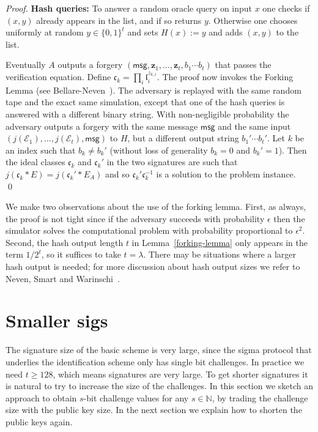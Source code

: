 \documentclass{llncs}
\newcommand{\E}{\mathcal{E}}
\newcommand{\N}{\mathbb{N}}
\newcommand{\msg}{\mathsf{msg}}
\renewcommand{\c}{\mathfrak{c}}
\renewcommand{\l}{\mathfrak{l}}
\newcommand{\z}{\mathbf{z}}
\begin{document}
\begin{proof}
\vskip 0.1cm

\noindent \textbf{Hash queries:}
To answer a random oracle query on input $x$ one checks if $(x,y)$ already appears in the list, and if so returns $y$. Otherwise one chooses uniformly at random $y \in \{0,1\}^t$ and sets $H(x) := y$ and adds $(x,y)$ to the list.

\vskip 0.1cm

Eventually $A$ outputs a forgery $(\msg, \z_1, \dots, \z_t, b_1\cdots b_t)$ that passes the verification equation.
Define $\c_k = \prod_i \l_i^{z_{k,i}}$.
The proof now invokes the Forking Lemma (see Bellare-Neven~\cite{BN06}). The adversary is replayed with the same random tape and the exact same simulation, except that one of the hash queries is answered with a different binary string.
With non-negligible probability the adversary outputs a forgery with the same message $\msg$ and the same input $(j(\E_1), \dots, j(\E_t), \msg)$ to $H$, but a different output string $b_1'\cdots b_t'$. Let $k$ be an index such that $b_k \ne b_k'$ (without loss of generality $b_k = 0$ and $b_k' = 1$). Then the ideal classes $\c_k$ and $\c_k'$ in the two signatures are such that $j( \c_k * E ) = j( \c_k' * E_A )$ and so $\c_k' \c_k^{-1}$ is a solution to the problem instance. \qed
\end{proof}


We make two observations about the use of the forking lemma.
First, as always, the proof is not tight since if the adversary succeeds with probability $\epsilon$ then the simulator solves the computational problem with probability proportional to $\epsilon^2$.
Second, the hash output length $t$ in Lemma~\ref{forking-lemma} only appears in the term $1/2^t$, so it suffices to take $t = \lambda$.
There may be situations where a larger hash output is needed; for more discussion about hash output sizes we refer to Neven, Smart and Warinschi~\cite{NSW09}.





\section{Smaller sigs}\label{sec:smaller-sigs}


The signature size of the basic scheme is very large, since the sigma protocol that underlies the identification scheme only has single bit challenges. 
In practice we need $t \ge 128$, which means signatures are very large.
To get shorter signatures it is natural to try to increase the size of the challenges.
In this section we sketch an approach to obtain $s$-bit challenge values for any $s \in \N$, by trading the challenge size with the public key size. In the next section we explain how to shorten the public keys again.
\end{document}
